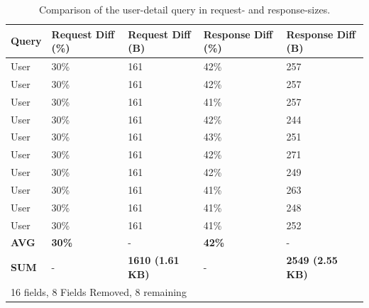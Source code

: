 \ifshowTables
\begin{table}[H]
  \begin{tabular}{|l|l|l|l|l|}
  \hline
  Query & Request Diff (\%) & Request Diff (B) & Response Diff (\%) & Response Diff (B) \\
  \hline
  User & 30\% & 161 & 42\% & 257 \\
  \hline
  User & 30\% & 161 & 42\% & 257 \\
  \hline
  User & 30\% & 161 & 41\% & 257 \\
  \hline
  User & 30\% & 161 & 42\% & 244 \\
  \hline
  User & 30\% & 161 & 43\% & 251 \\
  \hline
  User & 30\% & 161 & 42\% & 271 \\
  \hline
  User & 30\% & 161 & 42\% & 249 \\
  \hline
  User & 30\% & 161 & 41\% & 263 \\
  \hline
  User & 30\% & 161 & 41\% & 248 \\
  \hline
  User & 30\% & 161 & 41\% & 252 \\
  \hline
  \hline
  \textbf{AVG} & \textbf{30\%} & - & \textbf{42\%} & -  \\
  \hline
  \textbf{SUM} & - & \textbf{1610 (1.61 KB)} & - & \textbf{2549 (2.55 KB)} \\
  \hline
  \multicolumn{5}{l}{16 fields, 8 Fields Removed, 8 remaining}
  \end{tabular}
  \caption{Comparison of the user-detail query in request- and response-sizes.}\label{table:code:comparison-user-reduction}
\end{table}
\fi

\ifshowUnusedContent

